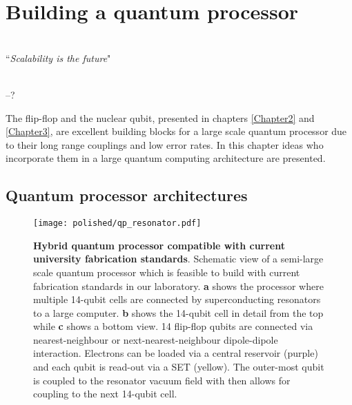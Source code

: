 
\chapter{Building a quantum processor} %

\label{Chapter4} %

\HRule
\vspace{0.5cm} \hspace{2cm}
\small
\hangindent=4cm
\\
        ``\emph{Scalability is the future}"
\\ \\
\hangindent=4cm
\begin{flushright}
--? \\
\end{flushright}

\vspace{0.5cm}

\noindent \HRule
\clearpage

The flip-flop and the nuclear qubit, presented in chapters \ref{Chapter2} and \ref{Chapter3}, are excellent building blocks for a large scale quantum processor due to their long range couplings and low error rates. In this chapter ideas who incorporate them in a large quantum computing architecture are presented.   

\section{Quantum processor architectures}

\begin{figure}
	\centering
	\texttt{[image: polished/qp\_resonator.pdf]}
	\caption[Hybrid quantum processor compatible with current university fabrication standards]{\textbf{Hybrid quantum processor compatible with current university fabrication standards}. Schematic view of a semi-large scale quantum processor which is feasible to build with current fabrication standards in our laboratory. \textbf{a} shows the processor where multiple 14-qubit cells are connected by superconducting resonators to a large computer. \textbf{b} shows the 14-qubit cell in detail from the top while \textbf{c} shows a bottom view. 14 flip-flop qubits are connected via nearest-neighbour or next-nearest-neighbour dipole-dipole interaction. Electrons can be loaded via a central reservoir (purple) and each qubit is read-out via a SET (yellow). The outer-most qubit is coupled to the resonator vacuum field with then allows for coupling to the next 14-qubit cell. }
	\label{fig:qp_14cell}
\end{figure}

